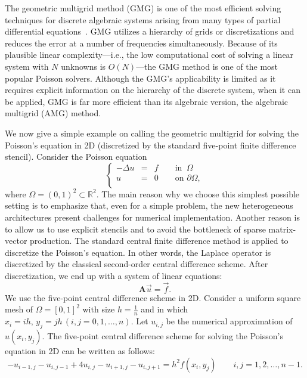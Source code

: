 \documentclass[11pt]{memoir}
\begin{document}
The geometric multigrid method (GMG) is one of the most efficient solving techniques for discrete algebraic systems arising from many types of partial differential equations~\cite{Bramble.Bramble.1993fk,Trottenberg.TrottenbergOosterlee.2001fu}. GMG utilizes a hierarchy of grids or discretizations and reduces the error at a number of frequencies simultaneously. Because of its plausible linear complexity---i.e., the low computational cost of solving a linear system with $N$ unknowns is $O(N)$---the GMG method is one of the most popular Poisson solvers. Although the GMG's applicability is limited as it requires explicit information on the hierarchy of the discrete system, when it can be applied, GMG is far more efficient than its algebraic version, the algebraic multigrid (AMG) method.

We now give a simple example on calling the geometric multigrid for solving the Poisson's equation in 2D (discretized by the standard five-point finite difference stencil). Consider the Poisson equation
\begin{equation*}
\left\{
\begin{array}{rcl}
    - \Delta u &=&  f  \qquad \mbox{in }~\Omega \\
      u &=& 0  \qquad \mbox{on }\partial\Omega, \\
\end{array}
\right.
\end{equation*}
where $\Omega = (0,1)^2 \subset \mathbb{R}^2$.
%
The main reason why we choose this simplest possible setting is to emphasize that, even for a simple problem, the new heterogeneous architectures present challenges for numerical implementation. Another reason is to allow us to use explicit stencils and to avoid the bottleneck of sparse matrix-vector production. 
%
The standard central finite difference method is applied to discretize the Poisson's equation. In other words, the Laplace operator is discretized by the classical second-order central difference scheme. After discretization, we end up with a system of linear equations:
%
     \begin{equation*}
        \mathbf{A}\vec{u} = \vec{f}.
    \end{equation*}
%    
We use the five-point central difference scheme in 2D. Consider a uniform square mesh of $\Omega = [0, 1]^2$
with size $h = \frac{1}{n}$ and in which $x_i = ih, \, y_j = jh \, (i, j = 0,
1,\ldots, n)$. Let $u_{i,j}$ be the numerical approximation of $u(x_i , y_j )$. The five-point central
difference scheme for solving the Poisson's equation in 2D can be written as follows:
$$
{-u_{i-1,j}-u_{i,j-1}+4u_{i,j}-u_{i+1,j}-u_{i,j+1}}={h^2}f(x_i,y_j)
\qquad i, j=1,2,\ldots,n-1.
$$
\end{document}
